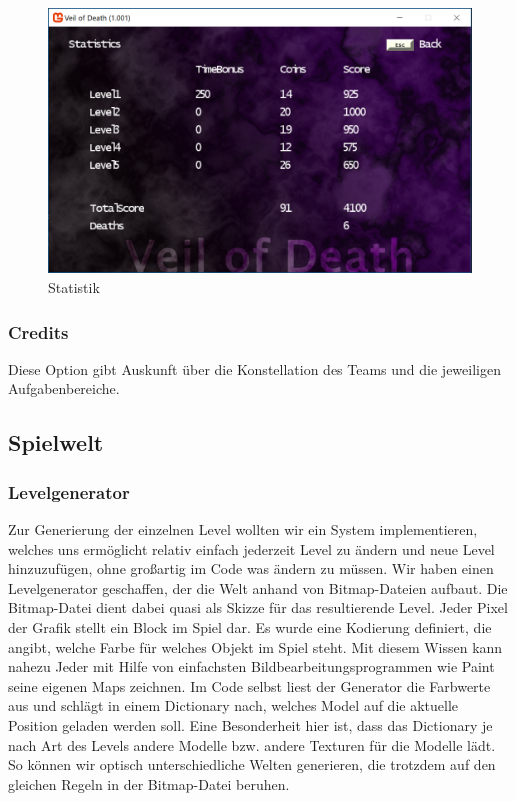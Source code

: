 \documentclass[10pt]{article}
\begin{document}
\begin{figure}[H]
	\centering
	\includegraphics[width=1\textwidth]{Statistics}
	\caption{Statistik
		\label{fig:statistics}}
\end{figure}

\vspace{0.5cm}
\subsubsection{Credits}

Diese Option gibt Auskunft über die Konstellation des Teams und die jeweiligen Aufgabenbereiche.

\newpage
\vspace{0.5cm}
\subsection{Spielwelt}

\vspace{0.5cm}
\subsubsection{Levelgenerator}
Zur Generierung der einzelnen Level wollten wir ein System implementieren, welches uns ermöglicht relativ einfach jederzeit Level zu ändern und neue Level hinzuzufügen, ohne großartig im Code was ändern zu müssen.
Wir haben einen Levelgenerator geschaffen, der die Welt anhand von Bitmap-Dateien aufbaut. Die Bitmap-Datei dient dabei quasi als Skizze für das resultierende Level. Jeder Pixel der Grafik stellt ein Block im Spiel dar.
Es wurde eine Kodierung definiert, die angibt, welche Farbe für welches Objekt im Spiel steht. Mit diesem Wissen kann nahezu Jeder mit Hilfe von einfachsten Bildbearbeitungsprogrammen wie Paint seine eigenen Maps zeichnen. \newline
Im Code selbst liest der Generator die Farbwerte aus und schlägt in einem Dictionary nach, welches Model auf die aktuelle Position geladen werden soll.
Eine Besonderheit hier ist, dass das Dictionary je nach Art des Levels andere Modelle bzw. andere Texturen für die Modelle lädt. So können wir optisch unterschiedliche Welten generieren, die trotzdem auf den gleichen Regeln in der Bitmap-Datei beruhen.
\end{document}

